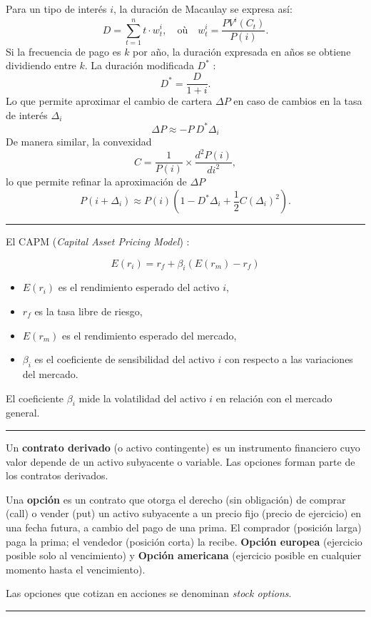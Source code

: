 \begin{f}

Para un tipo de interés \(i\), la duración de Macaulay se expresa así:
\[ 		
D = \sum_{t=1}^{n} t \cdot w^i_t, \quad \text{où} \quad w^i_t = \frac{PV^i(C_t)}{P(i)}.
 \]	
Si la frecuencia de pago es \(k\) por año, la duración expresada en años se obtiene dividiendo entre \(k\).
La duración modificada \(D^*\) :
\[ 	
D^* = \frac{D}{1 + i}.
 \]
Lo que permite aproximar el cambio de cartera \(\Delta P\) en caso de cambios en la tasa de interés \(\Delta_i\)
\[ 
\Delta P \approx -P\ D^* \Delta_i 
 \]
De manera similar, la convexidad
\[ 	
C = \frac{1}{P(i)} \times \frac{d^2 P(i)}{di^2},
 \]
lo que permite refinar la aproximación de \(\Delta P\)
\[ 	
P(i + \Delta_i) \approx P(i) \left( 1 -D^*\Delta_i + \frac{1}{2} C (\Delta_i)^2 \right).
 \]
\end{f}
\hrule



\begin{f}[CAPM]
  El CAPM (\textit{Capital Asset Pricing Model})  :

\[
E(r_i) = r_f + \beta_i (E(r_m) - r_f)
\]

\begin{itemize}
    \item \( E(r_i) \) es el rendimiento esperado del activo \( i \),
    \item \( r_f \) es la tasa libre de riesgo,
    \item \( E(r_m) \) es el rendimiento esperado del mercado,
    \item \( \beta_i \) es el coeficiente de sensibilidad del activo \( i \) con respecto a las variaciones del mercado.
\end{itemize}

El coeficiente \( \beta_i \) mide la volatilidad del activo \( i \) en relación con el mercado general.

\end{f}
\hrule


\begin{f}

Un \textbf{contrato derivado} (o activo contingente) es un instrumento financiero cuyo valor depende de un activo subyacente o variable. Las opciones forman parte de los contratos derivados.


Una \textbf{opción} es un contrato que otorga el derecho (sin obligación) de comprar (call) o vender (put) un activo subyacente a un precio fijo (precio de ejercicio) en una fecha futura, a cambio del pago de una prima.
El comprador (posición larga) paga la prima; el vendedor (posición corta) la recibe. \textbf{Opción europea} (ejercicio posible solo al vencimiento) y   
 \textbf{Opción americana} (ejercicio posible en cualquier momento hasta el vencimiento).

Las opciones que cotizan en acciones se denominan \textit{stock options}.

\end{f}
\hrule



